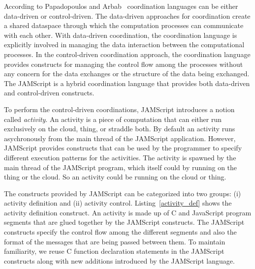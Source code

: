 \documentclass[11pt]{article}
\begin{document}
According to Papadopoulos and Arbab~\cite{Papadopoulos:1998kf} coordination
languages can be either data-driven or control-driven. The data-driven
approaches for coordination create a shared dataspace through which the
computation processes can communicate with each other. With data-driven
coordination, the coordination language is explicitly involved in managing the
data interaction between the computational processes. In the control-driven
coordination approach, the coordination language provides constructs for
managing the control flow among the processes without any concern for the data
exchanges or the structure of the data being exchanged. The JAMScript is a
hybrid coordination language that provides both data-driven and control-driven
constructs.

To perform the control-driven coordinations, JAMScript introduces a notion
called {\em activity}. An activity is a piece of computation that can either run
exclusively on the cloud, thing, or straddle both. By default an activity runs
asychronously from the main thread of the JAMScript application. However,
JAMScript provides constructs that can be used by the programmer to specify
different execution patterns for the activities. The activity is spawned by the
main thread of the JAMScript program, which itself could by running on the thing
or the cloud. So an activity could be running on the cloud or thing.

%

The constructs provided by JAMScript can be categorized into two groups: (i)
activity definition and (ii) activity control. Listing~\ref{activity_def} shows
the activity definition construct. An activity is made up of C and JavaScript
program segments that are glued together by the JAMScript constructs. The
JAMScript constructs specify the control flow among the different segments and
also the format of the messages that are being passed between them. To maintain
familiarity, we reuse C function declaration statements in the JAMScript
constructs along with new additions introduced by the JAMScript language.
\end{document}
